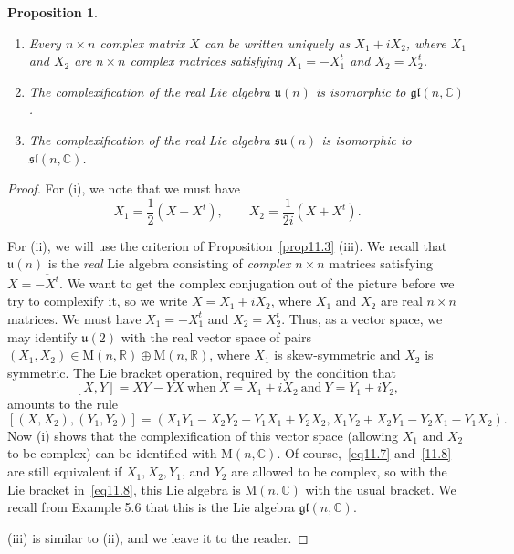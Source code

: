 \documentclass[12pt,reqno]{book}%
\newtheorem{proposition}{Proposition}[chapter]
\theoremstyle{definition}
\theoremstyle{remark}
\theoremstyle{theorem}
\theoremstyle{remark}
\begin{document}
\begin{proposition}\label{prop11.4}%
    \begin{enumerate}[label=(\roman*),font=\normalfont,before=\normalfont]
        \item Every $n \times n$ complex matrix $X$ can be written uniquely as $X_1 + iX_2$, where $X_1$ and $X_2$ are $n \times n$ complex matrices satisfying $X_1 = - X_1^t$ and $X_2 = X_2^t$.
        \item The complexification of the real Lie algebra $\mathfrak{u}(n)$ is isomorphic to $\mathfrak{gl}(n, \mathbb{C})$.
        \item The complexification of the real Lie algebra $\mathfrak{su}(n)$ is isomorphic to $\mathfrak{sl}(n, \mathbb{C})$.
    \end{enumerate}
\end{proposition}%
\begin{proof}%
    For (i), we note that we must have
    \[
        X_1 = \frac{1}{2}(X - X^t), \qquad X_2 = \frac{1}{2i} (X + X^t).
    \]

    For (ii), we will use the criterion of Proposition~\ref{prop11.3} (iii).
    We recall that $\mathfrak{u}(n)$ is the \emph{real} Lie algebra consisting of \emph{complex} $n \times n$ matrices satisfying $X = \overline{-X^t}$.
    We want to get the complex conjugation out of the picture before we try to complexify it, so we write $X = X_1 + iX_2$, where $X_1$ and $X_2$ are real $n \times n$ matrices.
    We must have $X_1 = - X_1^t$ and $X_2 = X_2^t$.
    Thus, as a vector space, we may identify $\mathfrak{u}(2)$ with the real vector space of pairs $(X_1, X_2) \in \mathrm{M}(n, \mathbb{R}) \oplus \mathrm{M}(n, \mathbb{R})$, where $X_1$ is skew-symmetric and $X_2$ is symmetric.
    The Lie bracket operation, required by the condition that
    \begin{equation}\label{eq11.7}
        [X, Y] = XY - YX \ \text{when} \ X = X_1 + iX_2 \ \text{and} \ Y = Y_1 + iY_2,
    \end{equation}
    amounts to the rule
    \begin{equation}\label{eq11.8}
        [(X, X_2), (Y_1, Y_2)] = (X_1Y_1 - X_2Y_2 - Y_1X_1 + Y_2X_2, X_1Y_2 + X_2Y_1 - Y_2X_1 - Y_1X_2).
    \end{equation}
    Now (i) shows that the complexification of this vector space (allowing $X_1$ and $X_2$ to be complex) can be identified with $\mathrm{M}(n, \mathbb{C})$.
    Of course,~\eqref{eq11.7} and~\eqref{11.8} are still equivalent if $X_1, X_2, Y_1$, and $Y_2$ are allowed to be complex, so with the Lie bracket in~\eqref{eq11.8}, this Lie algebra is $\mathrm{M}(n, \mathbb{C})$ with the usual bracket.
    We recall from Example 5.6 that this is the Lie algebra $\mathfrak{gl}(n, \mathbb{C})$.

    (iii) is similar to (ii), and we leave it to the reader.
\end{proof}%
\end{document}
